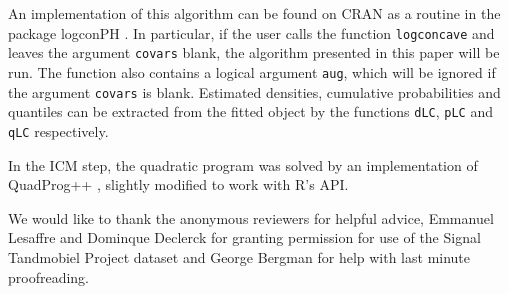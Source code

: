 	An implementation of this algorithm can be found on CRAN as a routine in the package logconPH \cite{R_logconPH}. In particular, if the user calls the function \texttt{logconcave} and leaves the argument \texttt{covars} blank, the algorithm presented in this paper will be run. The function also contains a logical argument \texttt{aug}, which will be ignored if the argument \texttt{covars} is blank. Estimated densities, cumulative probabilities and quantiles can be extracted from the fitted object by the functions \texttt{dLC}, \texttt{pLC} and \texttt{qLC} respectively. 
	
	
	In the ICM step, the quadratic program was solved by an implementation of QuadProg++ \cite{QP}, slightly modified to work with R's API. 

	\vspace{1.5cm}

	We would like to thank the anonymous reviewers for helpful advice,  Emmanuel Lesaffre and Dominque Declerck for granting permission for use of the Signal Tandmobiel{\textregistered} Project dataset and George Bergman for help with last minute proofreading.
	
